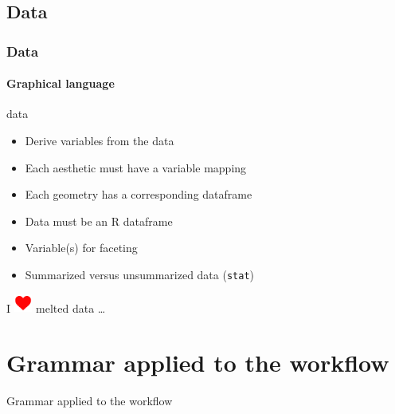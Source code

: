 \documentclass{beamer}
\begin{document}
\subsection{Data}
\begin{frame}\frametitle{Data}
\framesubtitle{Graphical language}
	\begin{block}{data}
		\begin{itemize}
			\item Derive variables from the data
			\item Each aesthetic must have a variable mapping
			\item Each geometry has a corresponding dataframe
			\item Data must be an R dataframe
			\item Variable(s) for faceting
			\item Summarized versus unsummarized data (\texttt{stat})
		\end{itemize}
	\end{block}
	\bigskip

\begin{center}

I \includegraphics[width=6mm,scale=0.5]{heart.png} melted data \ldots

\end{center}

\end{frame}


\section{Grammar applied to the workflow}

\begin{frame}
\begin{center}
Grammar applied to the workflow
\end{center}
\end{frame}
\end{document}
